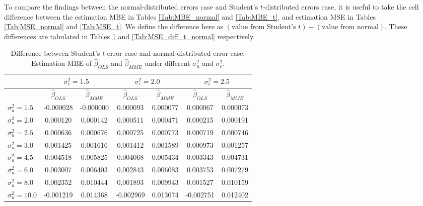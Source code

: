 \documentclass{article}
\begin{document}

To compare the findings between the normal-distributed errors case and Student's $t$-distributed errors case,
it is useful to take the cell difference between the estimation MBE in Tables \ref{Tab:MBE_normal} and \ref{Tab:MBE_t},
and estimation MSE in Tables \ref{Tab:MSE_normal} and \ref{Tab:MSE_t}.
We define the difference here as $(\textrm{value from Student's } t) - (\textrm{value from normal})$. 
These differences are tabulated in Tables \ref{Tab:MBE_diff_t_normal} and \ref{Tab:MSE_diff_t_normal} respectively.

\begin{table}[ht]
    \centering
    \caption{Difference between Student's $t$ error case and normal-distributed error case: Estimation MBE of $\hat{\beta}_{OLS}$ and $\hat{\beta}_{MME}$ under different $\sigma^2_u$ and $\sigma^2_\epsilon$.}
    \label{Tab:MBE_diff_t_normal}
    \begin{tabular}[t]{lcccccc}
        \hline
        &\multicolumn{2}{c}{$\sigma^2_\epsilon=1.5$}&\multicolumn{2}{c}{$\sigma^2_\epsilon=2.0$}&\multicolumn{2}{c}{$\sigma^2_\epsilon=2.5$}\\
        \hline
        &$\hat{\beta}_{OLS}$&$\hat{\beta}_{MME}$&$\hat{\beta}_{OLS}$&$\hat{\beta}_{MME}$&$\hat{\beta}_{OLS}$&$\hat{\beta}_{MME}$\\
        \hline
        $\sigma^2_u = 1.5$&-0.000028&-0.000000&0.000093&0.000077&0.000067&0.000073\\
        $\sigma^2_u = 2.0$&0.000120&0.000142&0.000511&0.000471&0.000215&0.000191\\
        $\sigma^2_u = 2.5$&0.000636&0.000676&0.000725&0.000773&0.000719&0.000746\\
        $\sigma^2_u = 3.0$&0.001425&0.001616&0.001412&0.001589&0.000973&0.001257\\
        $\sigma^2_u = 4.5$&0.004518&0.005825&0.004068&0.005434&0.003343&0.004731\\
        $\sigma^2_u = 6.0$&0.003007&0.006403&0.002843&0.006083&0.003753&0.007279\\
        $\sigma^2_u = 8.0$&0.002352&0.010444&0.001893&0.009943&0.001527&0.010159\\
        $\sigma^2_u = 10.0$&-0.001219&0.014368&-0.002969&0.013074&-0.002751&0.012402\\
        \hline
    \end{tabular}
\end{table}
\end{document}
